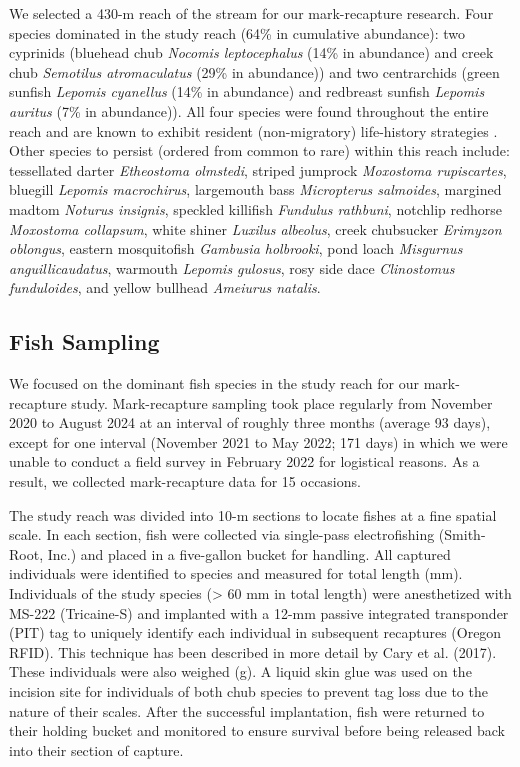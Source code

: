 \documentclass[11pt, class=article, crop=false]{standalone}
\begin{document}
We selected a 430-m reach of the stream for our mark-recapture research. Four species dominated in the study reach (64\% in cumulative abundance): two cyprinids (bluehead chub \textit{Nocomis leptocephalus} (14\% in abundance) and creek chub \textit{Semotilus atromaculatus} (29\% in abundance)) and two centrarchids (green sunfish \textit{Lepomis cyanellus} (14\% in abundance) and redbreast sunfish \textit{Lepomis auritus} (7\% in abundance)). All four species were found throughout the entire reach and are known to exhibit resident (non-migratory) life-history strategies \citep{teruiNonrandomDispersalSympatric2021}. Other species to persist (ordered from common to rare) within this reach include: tessellated darter \textit{Etheostoma olmstedi}, striped jumprock \textit{Moxostoma rupiscartes}, bluegill \textit{Lepomis macrochirus}, largemouth bass \textit{Micropterus salmoides}, margined madtom \textit{Noturus insignis}, speckled killifish \textit{Fundulus rathbuni}, notchlip redhorse \textit{Moxostoma collapsum}, white shiner \textit{Luxilus albeolus}, creek chubsucker \textit{Erimyzon oblongus}, eastern mosquitofish \textit{Gambusia holbrooki}, pond loach \textit{Misgurnus anguillicaudatus}, warmouth \textit{Lepomis gulosus}, rosy side dace \textit{Clinostomus funduloides}, and yellow bullhead \textit{Ameiurus natalis}. 

\subsection{Fish Sampling}

We focused on the dominant fish species in the study reach for our mark-recapture study. Mark-recapture sampling took place regularly from November 2020 to August 2024 at an interval of roughly three months (average 93 days), except for one interval (November 2021 to May 2022; 171 days) in which we were unable to conduct a field survey in February 2022 for logistical reasons. As a result, we collected mark-recapture data for 15 occasions.

The study reach was divided into 10-m sections to locate fishes at a fine spatial scale. In each section, fish were collected via single-pass electrofishing (Smith-Root, Inc.) and placed in a five-gallon bucket for handling. All captured individuals were identified to species and measured for total length (mm). Individuals of the study species (> 60 mm in total length) were anesthetized with MS-222 (Tricaine-S) and implanted with a 12-mm passive integrated transponder (PIT) tag to uniquely identify each individual in subsequent recaptures (Oregon RFID). This technique has been described in more detail by Cary et al. (2017). These individuals were also weighed (g). A liquid skin glue was used on the incision site for individuals of both chub species to prevent tag loss due to the nature of their scales. After the successful implantation, fish were returned to their holding bucket and monitored to ensure survival before being released back into their section of capture. 
\end{document}
